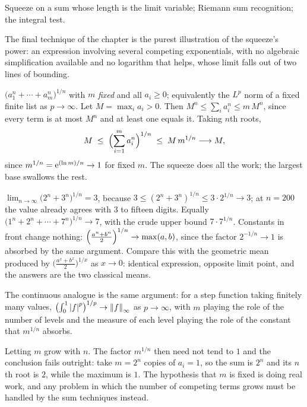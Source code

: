 \begin{seealsob}Squeeze on a sum whose length is the limit variable; Riemann sum recognition; the integral test.\end{seealsob}

The final technique of the chapter is the purest illustration of the squeeze's power: an expression involving several competing exponentials, with no algebraic simplification available and no logarithm that helps, whose limit falls out of two lines of bounding.

\cue $\bigl(a_{1}^{n}+\cdots+a_{m}^{n}\bigr)^{1/n}$ with $m$ \emph{fixed} and all $a_{i}\geq0$; equivalently the $L^{p}$ norm of a fixed finite list as $p\to\infty$.
\method Let $M=\max_{i}a_{i}>0$. Then $M^{n}\leq\sum_{i}a_{i}^{n}\leq m\,M^{n}$, since every term is at most $M^{n}$ and at least one equals it. Taking $n$th roots,
\[M\;\leq\;\Bigl(\sum_{i=1}^{m}a_{i}^{n}\Bigr)^{1/n}\;\leq\;M\,m^{1/n}\longrightarrow M,\]
since $m^{1/n}=\mathrm{e}^{(\ln m)/n}\to1$ for fixed $m$. The squeeze does all the work; the largest base swallows the rest.

\begin{worked}
$\displaystyle\lim_{n\to\infty}\bigl(2^{n}+3^{n}\bigr)^{1/n}=3$, because $3\leq(2^{n}+3^{n})^{1/n}\leq3\cdot2^{1/n}\to3$; at $n=200$ the value already agrees with $3$ to fifteen digits. Equally $\bigl(1^{n}+2^{n}+\cdots+7^{n}\bigr)^{1/n}\to7$, with the crude upper bound $7\cdot7^{1/n}$. Constants in front change nothing: $\Bigl(\tfrac{a^{n}+b^{n}}{2}\Bigr)^{1/n}\to\max(a,b)$, since the factor $2^{-1/n}\to1$ is absorbed by the same argument. Compare this with the geometric mean produced by $\bigl(\tfrac{a^{x}+b^{x}}{2}\bigr)^{1/x}$ as $x\to0$: identical expression, opposite limit point, and the answers are the two classical means.

The continuous analogue is the same argument: for a step function taking finitely many values, $\bigl(\int_{0}^{1}\left\lvert f\right\rvert^{p}\bigr)^{1/p}\to\left\lVert f\right\rVert_{\infty}$ as $p\to\infty$, with $m$ playing the role of the number of levels and the measure of each level playing the role of the constant that $m^{1/n}$ absorbs.
\end{worked}

\begin{trap}
Letting $m$ grow with $n$. The factor $m^{1/n}$ then need not tend to $1$ and the conclusion fails outright: take $m=2^{n}$ copies of $a_{i}=1$, so the sum is $2^{n}$ and its $n$th root is $2$, while the maximum is $1$. The hypothesis that $m$ is fixed is doing real work, and any problem in which the number of competing terms grows must be handled by the sum techniques instead.
\end{trap}

